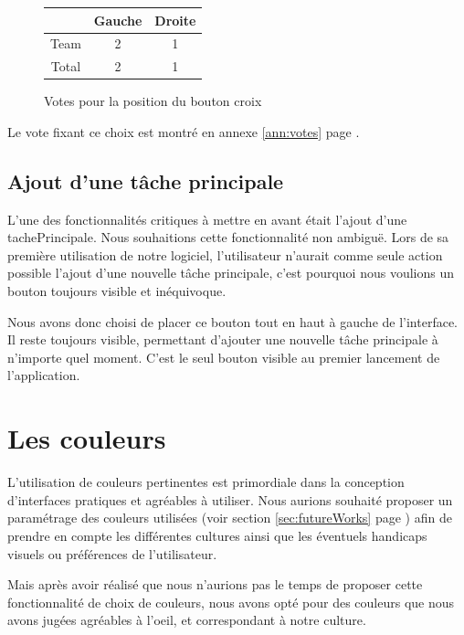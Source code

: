 \documentclass[11pt]{article}
\begin{document}
\begin{figure}[!h]
  \centering
  \begin{tabular}[!h]{cc|c}
    & Gauche & Droite\\
    \hline
    Team & 2 & 1\\
    \hline
    Total & 2 & 1\\
  \end{tabular}
  \caption{Votes pour la position du bouton croix}
  \label{fig:votecroix}
\end{figure}

Le vote fixant ce choix est montré en annexe \ref{ann:votes} page
\pageref{fig:croixgroupevote}.



\subsection{Ajout d'une tâche principale}

L'une des fonctionnalités critiques à mettre en avant était l'ajout
d'une \gls{tachePrincipale}. Nous souhaitions cette fonctionnalité non
ambiguë. Lors de sa première utilisation de notre logiciel,
l'utilisateur n'aurait comme seule action possible l'ajout d'une
nouvelle tâche principale, c'est pourquoi nous voulions un bouton
toujours visible et inéquivoque.

Nous avons donc choisi de placer ce bouton tout en haut à gauche de
l'interface. Il reste toujours visible, permettant d'ajouter une
nouvelle tâche principale à n'importe quel moment. C'est le seul
bouton visible au premier lancement de l'application.


\section{Les couleurs}

L'utilisation de couleurs pertinentes est primordiale dans la
conception d'interfaces pratiques et agréables à utiliser. Nous
aurions souhaité proposer un paramétrage des couleurs utilisées (voir
section \ref{sec:futureWorks} page \pageref{sec:futureWorks}) afin de
prendre en compte les différentes cultures ainsi que les éventuels
handicaps visuels ou préférences de l'utilisateur.

Mais après avoir réalisé que nous n'aurions pas le temps de proposer
cette fonctionnalité de choix de couleurs, nous avons opté pour des
couleurs que nous avons jugées agréables à l'oeil, et correspondant à
notre culture.
\end{document}
